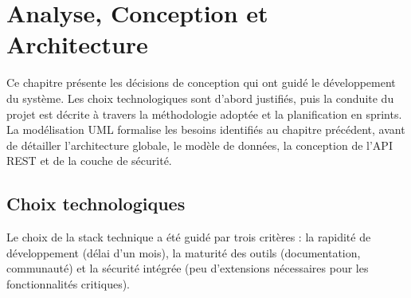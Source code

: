 \chapter{Analyse, Conception et Architecture}

\onehalfspacing

Ce chapitre présente les décisions de conception qui ont guidé le développement du système. Les choix technologiques sont d'abord justifiés, puis la conduite du projet est décrite à travers la méthodologie adoptée et la planification en sprints. La modélisation UML formalise les besoins identifiés au chapitre précédent, avant de détailler l'architecture globale, le modèle de données, la conception de l'API REST et de la couche de sécurité.

\section{Choix technologiques}

Le choix de la stack technique a été guidé par trois critères : la rapidité de développement (délai d'un mois), la maturité des outils (documentation, communauté) et la sécurité intégrée (peu d'extensions nécessaires pour les fonctionnalités critiques).

